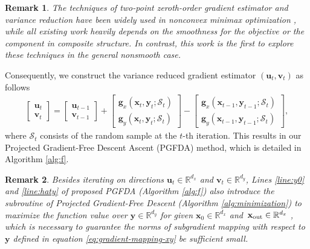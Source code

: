 \documentclass[11pt]{article}
\def\vg{\mathbf{g}}
\def\vu{\mathbf{u}}
\def\vv{\mathbf{v}}
\def\vx{\mathbf{x}}
\def\vy{\mathbf{y}}
\def\fS{{\mathcal{S}}}
\def\BR{{\mathbb{R}}}
\newtheorem{remark}{Remark}
\begin{document}
\begin{remark}
The techniques of two-point zeroth-order gradient estimator \citep{yousefian2012stochastic,duchi2012randomized,nesterov2017random,shamir2017optimal} and variance reduction \citep{li2021page,fang2018spider} have been widely used in nonconvex minimax optimization \citep{xu2024derivative,huang2022accelerated,wang2023zeroth,xu2020gradient,luo2020stochastic,
yang2020catalyst,yan2020optimal,zhang2022sapd+,yang2020global,chen2024efficient,chen2022faster}, while all existing work heavily depends on the smoothness for the objective or the component in composite structure. 
In contrast, this work is the first to explore these techniques in the general nonsmooth case.
\end{remark}


Consequently, we construct the variance reduced gradient estimator $(\vu_t,\vv_t)$ as follows
\begin{align*}
\begin{bmatrix}
    \vu_t \\ \vv_t
\end{bmatrix}
= \begin{bmatrix}
    \vu_{t-1} \\ \vv_{t-1}
  \end{bmatrix}
   + \begin{bmatrix}
        \vg_x(\vx_t,\vy_t;\fS_t) \\ 
        \vg_y(\vx_t,\vy_t;\fS_t)
    \end{bmatrix}        
   - \begin{bmatrix}
            \vg_x(\vx_{t-1},\vy_{t-1};\fS_t) \\ 
            \vg_y(\vx_{t-1},\vy_{t-1};\fS_t)
   \end{bmatrix},
\end{align*}
where $\fS_t$ consists of the random sample at the $t$-th iteration.
This results in our Projected Gradient-Free Descent Ascent (PGFDA) method, which is detailed in Algorithm \ref{alg:f}.

\begin{remark}
Besides iterating on directions $\vu_t\in\BR^{d_x}$ and $\vv_t\in\BR^{d_y}$, Lines \ref{line:y0} and \ref{line:haty} of proposed PGFDA (Algorithm \ref{alg:f}) also introduce the subroutine of Projected Gradient-Free Descent (Algorithm \ref{alg:minimization}) to maximize the function value over $\vy\in\BR^{d_y}$ for given $\vx_0\in\BR^{d_x}$ and~$\vx_{\rm out}\in\BR^{d_x}$ , which is necessary to guarantee the norms of subgradient mapping with respect to $\vy$ defined in equation \eqref{eq:gradient-mapping-xy} be sufficient small.        
\end{remark}
\end{document}

